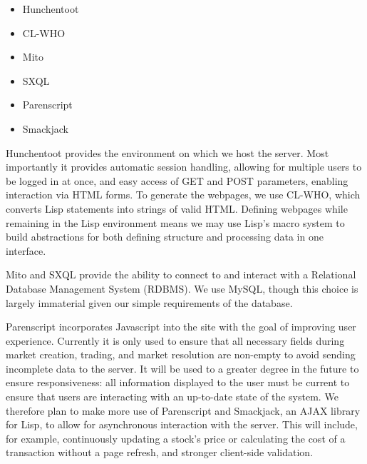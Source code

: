 \begin{itemize}
	\itemsep0em
	\item Hunchentoot
	\item CL-WHO
	\item Mito
	\item SXQL
	\item Parenscript
	\item Smackjack
\end{itemize}

Hunchentoot provides the environment on which we host the server. Most
importantly it provides automatic session handling, allowing for multiple users
to be logged in at once, and easy access of GET and POST parameters, enabling
interaction via HTML forms. To generate the webpages, we use CL-WHO, which
converts Lisp statements into strings of valid HTML. Defining webpages while
remaining in the Lisp environment means we may use Lisp's macro system to build
abstractions for both defining structure and processing data in one interface.

Mito and SXQL provide the ability to connect to and interact with a Relational
Database Management System (RDBMS). We use MySQL, though this choice is largely
immaterial given our simple requirements of the database.

Parenscript incorporates Javascript into the site with the goal of improving
user experience. Currently it is only used to ensure that all necessary fields
during market creation, trading, and market resolution are non-empty to avoid
sending incomplete data to the server. It will be used to a greater degree in
the future to ensure responsiveness: all information displayed to the user must
be current to ensure that users are interacting with an up-to-date state of the
system. We therefore plan to make more use of Parenscript and Smackjack, an
AJAX library for Lisp, to allow for asynchronous interaction with the server.
This will include, for example, continuously updating a stock's price or
calculating the cost of a transaction without a page refresh, and stronger
client-side validation.

